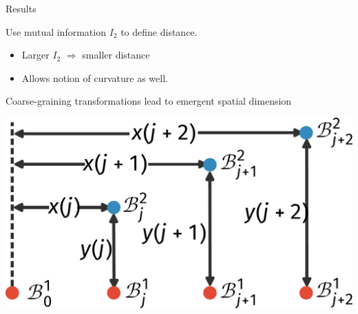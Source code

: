 \documentclass[aspectratio=169]{beamer}
\begin{document}
\begin{frame}{Results}
\begin{minipage}{0.53\textwidth}
	Use mutual information \(I_2\) to define \alert{distance}.
\begin{itemize}
	\item Larger \(I_2\) \(\Longrightarrow\) smaller distance\\[10pt]
	\item Allows notion of \alert{curvature} as well.\\[10pt]
\end{itemize}
Coarse-graining transformations lead to \alert{emergent} spatial dimension
\end{minipage}
\hspace*{\fill}
\begin{minipage}{0.43\textwidth}
	\includegraphics[width=\textwidth]{curvature-scheme.pdf}
\end{minipage}


\end{frame}
\end{document}
